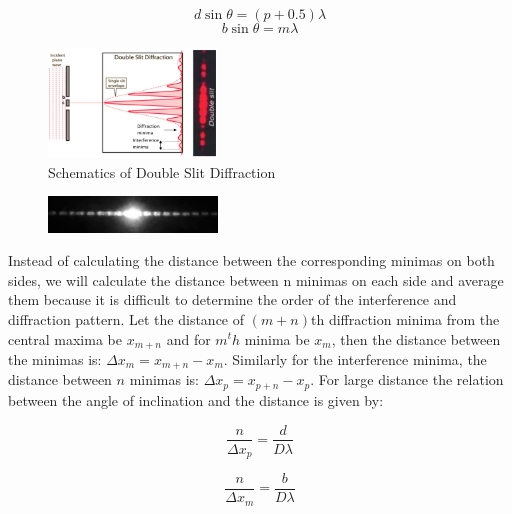 		$$d\sin\theta = (p+0.5)\lambda$$
		$$b\sin\theta = m\lambda$$

		\begin{figure}[H]
			\centering
			\includegraphics[width=0.4\textwidth]{images/double_slit.png}
			\caption{Schematics of Double Slit Diffraction}
			\label{fig:2}
		\end{figure}

		\begin{figure}[H]
			\centering
			\includegraphics[width=0.4\textwidth]{images/photo_2.png}
			\label{pic:2}
		\end{figure}

		Instead of calculating the distance between the corresponding minimas on both sides, we will calculate the distance between n minimas on each side and average them because it is difficult to determine the order of the interference and diffraction pattern. Let the distance of $(m+n)$th diffraction minima from the central maxima be $x_{m+n}$ and for $m^th$ minima be $x_m$, then the distance between the minimas is: $\Delta x_m = x_{m+n} - x_m$. Similarly for the interference minima, the distance between $n$ minimas is: $\Delta x_p = x_{p+n} - x_p$. For large distance the relation between the angle of inclination and the distance is given by:

		\begin{equation}
			\frac{n}{\Delta x_p} = \frac{d}{D\lambda}
			\label{eqn:3}
		\end{equation}

		\begin{equation}
			\frac{n}{\Delta x_m} = \frac{b}{D\lambda}
			\label{eqn:4}
		\end{equation}

